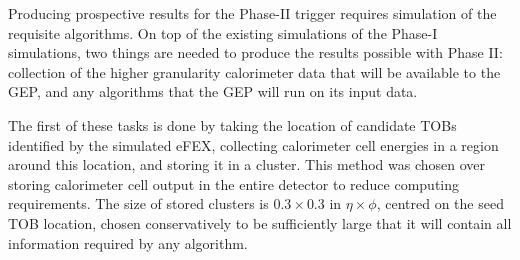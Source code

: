 
Producing prospective results for the Phase-II trigger requires simulation of
the requisite algorithms. On top of the existing simulations of the Phase-I
simulations, two things are needed to produce the results possible with Phase
II: collection of the higher granularity calorimeter data that will be available
to the \ac{GEP}, and any algorithms that the \ac{GEP} will run on its input
data.

The first of these tasks is done by taking the location of \egamma candidate
\ac{TOB}s identified by the simulated \ac{eFEX}, collecting calorimeter cell
energies in a region around this location, and storing it in a cluster. This
method was chosen over storing calorimeter cell output in the entire detector to
reduce computing requirements. The size of stored clusters is $0.3\times0.3$ in
$\eta\times\phi$, centred on the seed \ac{TOB} location, chosen conservatively
to be sufficiently large that it will contain all information required by any
algorithm.
